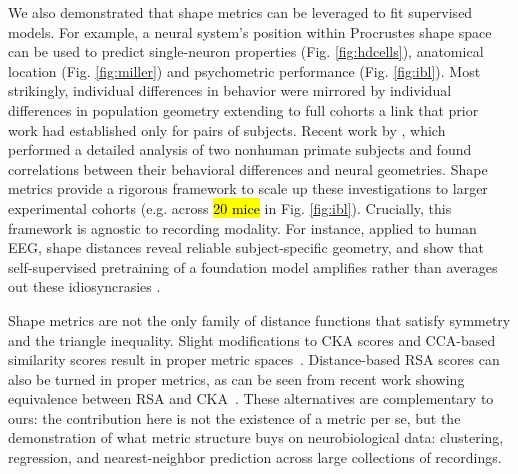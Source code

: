 We also demonstrated that shape metrics can be leveraged to fit supervised models.
For example, a neural system's position within Procrustes shape space can be used to predict single-neuron properties (Fig. \ref{fig:hdcells}), anatomical location (Fig. \ref{fig:miller}) and  psychometric performance (Fig. \ref{fig:ibl}).
Most strikingly, individual differences in behavior were mirrored by individual differences in population geometry extending to full cohorts a link that prior work had established only for pairs of subjects.
Recent work by \textcite{fascianelli2024neural}, which performed a detailed analysis of two nonhuman primate subjects and found correlations between their behavioral differences and neural geometries.
Shape metrics provide a rigorous framework to scale up these investigations to larger experimental cohorts (e.g. across \hl{20 mice} in Fig. \ref{fig:ibl}). Crucially, this framework is agnostic to recording modality. For instance, applied to human EEG, shape distances reveal reliable subject-specific geometry, and show that self-supervised pretraining of a foundation model \parencite{cui2024,wang2025} amplifies rather than averages out these idiosyncrasies \parencite{marty2026self}.

Shape metrics are not the only family of distance functions that satisfy symmetry and the triangle inequality.
Slight modifications to CKA scores and CCA-based similarity scores result in proper metric spaces~\parencite{Williams2021}.
Distance-based RSA scores can also be turned in proper metrics, as can be seen from recent work showing equivalence between RSA and CKA~\parencite{Williams2024}. These alternatives are complementary to ours: the contribution here is not the existence of a metric per se, but the demonstration of what metric structure buys on neurobiological data: clustering, regression, and nearest-neighbor prediction across large collections of recordings.

